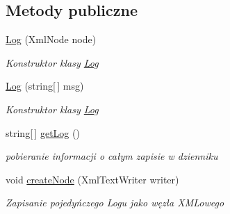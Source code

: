 \subsection*{Metody publiczne}
\begin{DoxyCompactItemize}
\item 
\hyperlink{class_z_s_t_1_1_log_a07cddad83ae898c2c6013a2b5c20d6d8}{Log} (Xml\+Node node)
\begin{DoxyCompactList}\small\item\em Konstruktor klasy \hyperlink{class_z_s_t_1_1_log}{Log} \end{DoxyCompactList}\item 
\hyperlink{class_z_s_t_1_1_log_aea522d0f2791697d32fd1d30df121391}{Log} (string\mbox{[}$\,$\mbox{]} msg)
\begin{DoxyCompactList}\small\item\em Konstruktor klasy \hyperlink{class_z_s_t_1_1_log}{Log} \end{DoxyCompactList}\item 
string\mbox{[}$\,$\mbox{]} \hyperlink{class_z_s_t_1_1_log_a1c256684db52090c18ade4f4a8058157}{get\+Log} ()
\begin{DoxyCompactList}\small\item\em pobieranie informacji o całym zapisie w dzienniku \end{DoxyCompactList}\item 
void \hyperlink{class_z_s_t_1_1_log_a96caeb14ebf1c3b16ca33fe71e42e962}{create\+Node} (Xml\+Text\+Writer writer)
\begin{DoxyCompactList}\small\item\em Zapisanie pojedyńczego Logu jako węzła X\+M\+Lowego \end{DoxyCompactList}\end{DoxyCompactItemize}
